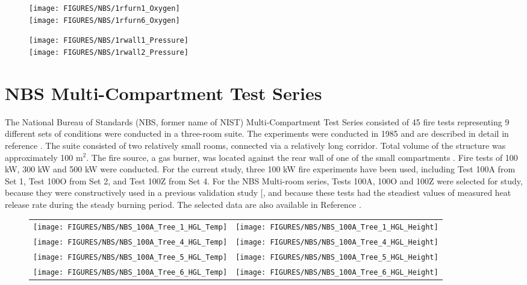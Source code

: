 \begin{figure}[p]
\begin{center}
\texttt{[image: FIGURES/NBS/1rfurn1\_Oxygen]} \\
\texttt{[image: FIGURES/NBS/1rfurn6\_Oxygen]}
\end{center}
\end{figure}

\begin{figure}[p]
\begin{center}
\texttt{[image: FIGURES/NBS/1rwall1\_Pressure]} \\
\texttt{[image: FIGURES/NBS/1rwall2\_Pressure]}
\end{center}
\end{figure}

\clearpage

\section{NBS Multi-Compartment Test Series}

The National Bureau of Standards (NBS, former name of NIST) Multi-Compartment Test Series consisted of 45 fire tests representing 9 different sets of conditions were conducted in a three-room suite.  The experiments were conducted in 1985 and are described in detail in reference \cite{Peacock:1988}.  The suite consisted of two relatively small rooms, connected via a relatively long corridor. Total volume of the structure was approximately 100 m$^2$. The fire source, a gas burner, was located against the rear wall of one of the small compartments . Fire tests of 100 kW, 300 kW and 500 kW were conducted. For the current  study, three 100 kW fire experiments have been used, including Test 100A from Set 1, Test 100O from Set 2, and Test 100Z from Set 4. For the NBS Multi-room series, Tests 100A, 100O and 100Z were selected for study, because they were constructively used in a previous validation study [\cite{EPRI}, and because these tests had  the steadiest values of measured heat release rate during the steady burning period. The selected data are also available in Reference \cite{EPRI}.

\begin{figure}[p]
\begin{tabular*}{\textwidth}{l@{\extracolsep{\fill}}r}
\texttt{[image: FIGURES/NBS/NBS\_100A\_Tree\_1\_HGL\_Temp]} &
\texttt{[image: FIGURES/NBS/NBS\_100A\_Tree\_1\_HGL\_Height]} \\
\texttt{[image: FIGURES/NBS/NBS\_100A\_Tree\_4\_HGL\_Temp]} &
\texttt{[image: FIGURES/NBS/NBS\_100A\_Tree\_4\_HGL\_Height]} \\
\texttt{[image: FIGURES/NBS/NBS\_100A\_Tree\_5\_HGL\_Temp]} &
\texttt{[image: FIGURES/NBS/NBS\_100A\_Tree\_5\_HGL\_Height]}\\
\texttt{[image: FIGURES/NBS/NBS\_100A\_Tree\_6\_HGL\_Temp]} &
\texttt{[image: FIGURES/NBS/NBS\_100A\_Tree\_6\_HGL\_Height]}
\end{tabular*}
\end{figure}

